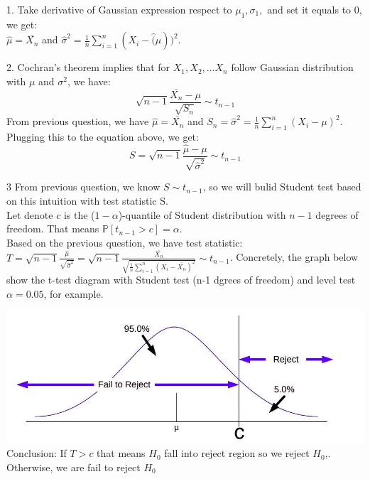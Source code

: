 \documentclass[10pt]{article}
\newenvironment{problem}[2][Problem]{\begin{trivlist}
\item[\hskip \labelsep {\bfseries #1}\hskip \labelsep {\bfseries #2.}]}{\end{trivlist}}
\begin{document}
\begin{problem}{2}
\item 1.
Take derivative of Gaussian expression respect to $\mu_1, \sigma_1,$ and set it equals to 0, we get:\\
$\hat{\mu}=\bar{X_{n}}$ and $\hat{\sigma}^2=\frac{1}{n}\sum_{i=1}^{n} (X_i-\hat(\mu))^2$.

\item 2.
Cochran’s theorem implies that for $X_1, X_2,...X_n$ follow Gaussian distribution with $\mu$ and $\sigma^2$, we have: 
\[\sqrt{n-1}\frac{\bar{X_n}-\mu}{\sqrt{S_n}} \sim t_{n-1} \]
From previous question, we have $\hat{\mu}=\bar{X_{n}}$ and $S_n=\hat{\sigma}^2=\frac{1}{n}\sum_{i=1}^{n} (X_i-\mu)^2$. Plugging this to the equation above, we get:
\[S=\sqrt{n-1}\frac{\hat{\mu}- \mu}{\sqrt{\hat{\sigma}^2}} \sim t_{n-1} \] 

\item 3 
From previous question, we know $S \sim t_{n-1}$, so we will bulid Student test based on this intuition with test statistic S.\\ 
Let denote $c$ is the ($1-\alpha$)-quantile of Student distribution with $n-1$ degrees of freedom. That means $\mathbb{P}[t_{n-1}> c]=\alpha$.\\
Based on the previous question, we have test statistic: $T=\sqrt{n-1}\frac{\hat{\mu}}{\sqrt{\hat{\sigma}^2}}= \sqrt{n-1}\frac{\bar{X_n}}{\sqrt{\frac{1}{n}\sum_{i=1}^{n} (X_i-\bar{X_n})^2}} \sim t_{n-1}$. Concretely, the graph below show the t-test diagram with Student test (n-1 dgrees of freedom) and level test $\alpha=0.05$, for example. 

\includegraphics[totalheight=5cm]{img.jpg}\\
Conclusion: If $T>c$ that means $H_0$ fall into reject region so we reject $H_0$,. Otherwise, we are fail to reject $H_0$














\end{problem}
\end{document}
